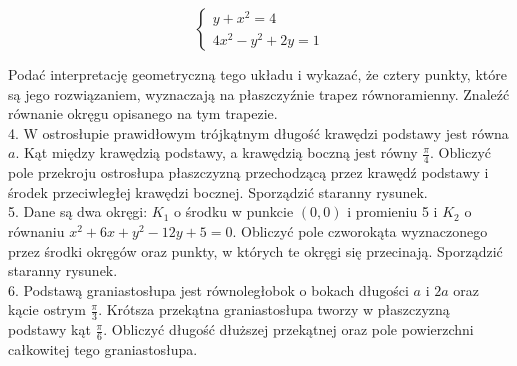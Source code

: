 \documentclass[10pt]{article}
\begin{document}
$$
\left\{\begin{array}{l}
y+x^{2}=4 \\
4 x^{2}-y^{2}+2 y=1
\end{array}\right.
$$

Podać interpretację geometryczną tego układu i wykazać, że cztery punkty, które są jego rozwiązaniem, wyznaczają na płaszczyźnie trapez równoramienny. Znaleźć równanie okręgu opisanego na tym trapezie.\\
4. W ostrosłupie prawidłowym trójkątnym długość krawędzi podstawy jest równa $a$. Kąt między krawędzią podstawy, a krawędzią boczną jest równy $\frac{\pi}{4}$. Obliczyć pole przekroju ostrosłupa płaszczyzną przechodzącą przez krawędź podstawy i środek przeciwległej krawędzi bocznej. Sporządzić staranny rysunek.\\
5. Dane są dwa okręgi: $K_{1}$ o środku w punkcie $(0,0)$ i promieniu 5 i $K_{2}$ o równaniu $x^{2}+6 x+y^{2}-12 y+5=0$. Obliczyć pole czworokąta wyznaczonego przez środki okręgów oraz punkty, w których te okręgi się przecinają. Sporządzić staranny rysunek.\\
6. Podstawą graniastosłupa jest równoległobok o bokach długości $a$ i $2 a$ oraz kącie ostrym $\frac{\pi}{3}$. Krótsza przekątna graniastosłupa tworzy w płaszczyzną podstawy kąt $\frac{\pi}{6}$. Obliczyć długość dłuższej przekątnej oraz pole powierzchni całkowitej tego graniastosłupa.
\end{document}
